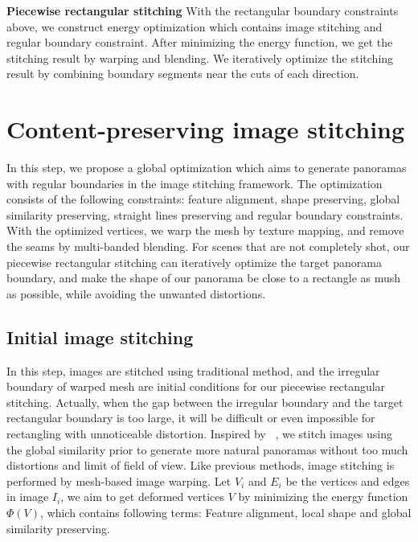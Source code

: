 \documentclass[10pt,journal,compsoc]{IEEEtran}
\begin{document}
 \textbf{Piecewise rectangular stitching}
With the rectangular boundary constraints above, we construct energy optimization which contains image stitching and regular boundary constraint.
After minimizing the energy function, we get the stitching result by warping and blending.
We iteratively optimize the stitching result by combining boundary segments near the cuts of each direction.

\section{Content-preserving image stitching}
 In this step, we propose a global optimization which aims to generate panoramas with regular boundaries in the image stitching framework.
 The optimization consists of the following constraints: feature alignment, shape preserving, global similarity preserving, straight lines preserving and regular boundary constraints.
With the optimized vertices, we warp the mesh by texture mapping, and remove the seams by multi-banded blending.
For scenes that are not completely shot, our piecewise rectangular stitching can iteratively optimize the target panorama boundary, and make the shape of our panorama be close to a rectangle as mush as possible, while avoiding the unwanted distortions.

 \subsection{Initial image stitching}
 \label{sec:Initial image stitching}
 In this step, images are stitched using traditional method, and the irregular boundary of warped mesh are initial conditions for our piecewise rectangular stitching.
 Actually, when the gap between the irregular boundary and the target rectangular boundary is too large, it will be difficult or even impossible for rectangling with unnoticeable distortion.
 Inspired by ~\cite{conf/eccv/ChenC16}, we stitch images using the global similarity prior to generate more natural panoramas without too much distortions and limit of field of view.
 Like previous methods, image stitching is performed by mesh-based image warping.
 Let $V_i$ and $E_i$ be the vertices and edges in image $I_i$, we aim to get deformed vertices $V$ by minimizing the energy function $\Phi(V)$, which contains following terms:
Feature alignment, local shape and global similarity preserving.
\end{document}
